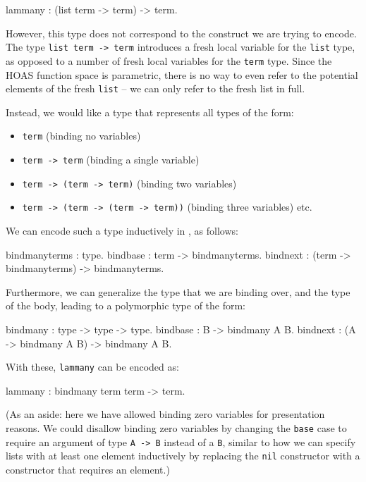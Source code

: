 \documentclass[format=acmlarge,review,anonymous]{acmart}\settopmatter{printfolios=true}
\begin{document}
\begin{codequote}
lammany : (list term -> term) -> term.
\end{codequote}

However, this type does not correspond to the construct we are trying to
encode. The type \texttt{list term -> term} introduces a
fresh local variable for the \texttt{list} type, as opposed to a number
of fresh local variables for the \texttt{term} type. Since the HOAS
function space is parametric, there is no way to even refer to the
potential elements of the fresh \texttt{list} -- we can only refer to
the fresh list in full.

Instead, we would like a type that represents all types of the form:
\begin{itemize}
\item \texttt{term} (binding no variables)
\item \texttt{term -> term} (binding a single variable)
\item \texttt{term -> (term -> term)} (binding two variables)
\item \texttt{term -> (term -> (term -> term))} (binding three variables) etc.
\end{itemize}

We can encode such a type inductively in \lamprolog, as follows:

\begin{codequote}
bindmanyterms : type.
bindbase : term -> bindmanyterms.
bindnext : (term -> bindmanyterms) -> bindmanyterms.
\end{codequote}

Furthermore, we can generalize the type that we are binding over, and
the type of the body, leading to a polymorphic type of the form:

\begin{codequote}
bindmany : type -> type -> type.
bindbase : B -> bindmany A B.
bindnext : (A -> bindmany A B) -> bindmany A B.
\end{codequote}

With these, \texttt{lammany} can be encoded as:

\begin{codequote}
lammany : bindmany term term -> term.
\end{codequote}

(As an aside: here we have allowed binding zero variables for
presentation reasons. We could disallow binding zero variables by
changing the \texttt{base} case to require an argument of type
\texttt{A -> B} instead of a \texttt{B}, similar to how we
can specify lists with at least one element inductively by replacing the
\texttt{nil} constructor with a constructor that requires an element.)
\end{document}
